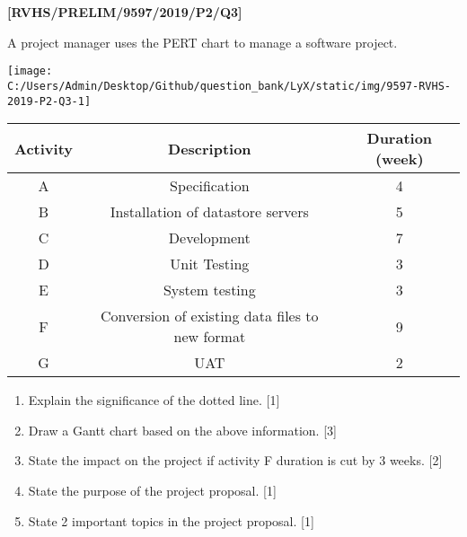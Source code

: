 \item \textbf{{[}RVHS/PRELIM/9597/2019/P2/Q3{]} }

A project manager uses the PERT chart to manage a software project.
\begin{center}
\texttt{[image: C:/Users/Admin/Desktop/Github/question\_bank/LyX/static/img/9597-RVHS-2019-P2-Q3-1]}
\par\end{center}

\noindent \begin{center}
\begin{tabular}{|c|c|c|}
\hline 
\textbf{Activity} & \textbf{Description} & \textbf{Duration (week)}\tabularnewline
\hline 
A & Specification & 4\tabularnewline
\hline 
B & Installation of datastore servers & 5\tabularnewline
\hline 
C & Development & 7\tabularnewline
\hline 
D & Unit Testing & 3\tabularnewline
\hline 
E & System testing & 3\tabularnewline
\hline 
F & Conversion of existing data files to new format & 9\tabularnewline
\hline 
G & UAT & 2\tabularnewline
\hline 
\end{tabular}
\par\end{center}
\begin{enumerate}
\item Explain the significance of the dotted line. \hfill{}{[}1{]}
\item Draw a Gantt chart based on the above information.\hfill{} {[}3{]}
\item State the impact on the project if activity F duration is cut by 3
weeks.\hfill{} {[}2{]}
\item State the purpose of the project proposal.\hfill{} {[}1{]}
\item State 2 important topics in the project proposal. \hfill{}{[}1{]}
\end{enumerate}